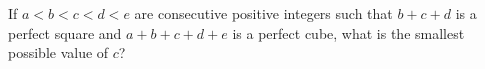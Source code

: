 If $a<b<c<d<e$ are consecutive positive integers such that $b+c+d$ is a perfect square and $a+b+c+d+e$ is a perfect cube, what is the smallest possible value of $c$?